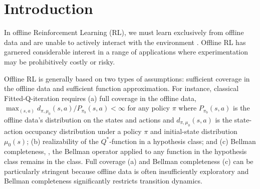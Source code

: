 
\section{Introduction}\label{sec:intro}

In offline Reinforcement Learning (RL), we must learn exclusively from offline data and are unable to actively interact with the environment \citep{levine2020offline}. Offline RL has garnered considerable interest in a range of applications %
where experimentation may be prohibitively costly or risky.



Offline RL is generally based on two types of assumptions:  sufficient coverage in the offline data and sufficient function approximation. For instance, classical Fitted-Q-iteration \citep{antos2008learning,chen2019information} requires (a) full coverage in the offline data, $\max_{(s,a)} d_{\pi,\mu_0}(s,a)/P_{\pi_b}(s,a)<\infty$ for any policy $\pi$ where $P_{\pi_b}(s,a)$ is the offline data's distribution on the states and actions and $d_{\pi,\mu_0}(s,a)$ is the state-action occupancy distribution under a policy $\pi$ and initial-state distribution $\mu_0(s)$; (b) realizability of the $Q^*$-function in a hypothesis class; and (c) Bellman completeness, \ie, the Bellman operator applied to any function in the hypothesis class remains in the class. Full coverage (a) and Bellman completeness (c) can be particularly stringent because offline data is often insufficiently exploratory  and Bellman completeness significantly restricts transition dynamics.





